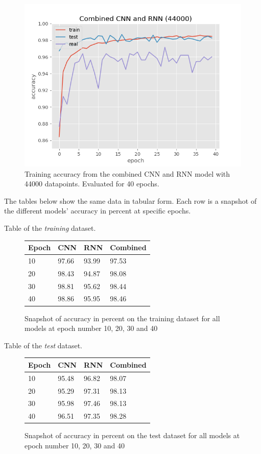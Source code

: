 \begin{figure}[H]
    \centering
    \includegraphics[width=.8\linewidth]{Assets/Chapter4_Result/Combined_CNN_and_RNN_40_epoch.png}
    \caption{Training accuracy from the combined CNN and RNN model with 44000 datapoints. Evaluated for 40 epochs.}
    \label{fig:combined_CNN_RNN_44000}
\end{figure}

The tables below show the same data in tabular form. Each row is a snapshot of the different models' accuracy in percent at specific epochs. 

Table of the \textit{training} dataset.
\begin{figure}[H]
    \centering
        \begin{tabular}{| p{2cm} | p{3cm} | p{3cm} | p{3cm} |}
    \hline
    Epoch & \textbf{CNN} & \textbf{RNN} & \textbf{Combined} \\ \hline
    10 & 97.66 & 93.99 & 97.53 \\ \hline
    20 & 98.43 & 94.87 & 98.08 \\ \hline
    30 & 98.81 & 95.62 & 98.44 \\ \hline
    40 & 98.86 & 95.95 & 98.46 \\ \hline
    \end{tabular}
    \caption{Snapshot of accuracy in percent on the training dataset for all models at epoch number 10, 20, 30 and 40}

    \label{fig:table_train_dataset}
\end{figure}

Table of the \textit{test} dataset.
\begin{figure}[H]
    \centering
    \begin{tabular}{| p{2cm} | p{3cm} | p{3cm} | p{3cm} |}
    \hline
    Epoch & \textbf{CNN} & \textbf{RNN} & \textbf{Combined} \\ \hline
    10 & 95.48 & 96.82 & 98.07 \\ \hline
    20 & 95.29 & 97.31 & 98.13 \\ \hline
    30 & 95.98 & 97.46 & 98.13 \\ \hline
    40 & 96.51 & 97.35 & 98.28 \\ \hline
    \end{tabular}
    \caption{Snapshot of accuracy in percent on the test dataset for all models at epoch number 10, 20, 30 and 40}
    \label{fig:table_test_dataset}

\end{figure}

